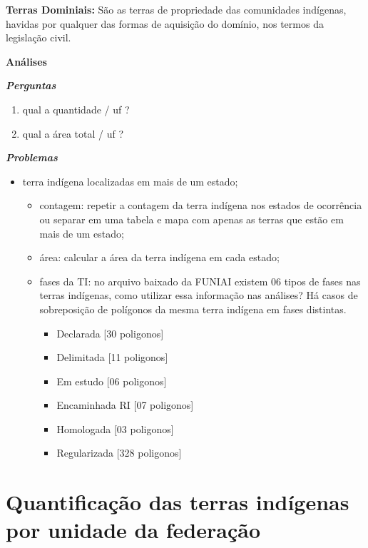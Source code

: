 \documentclass[
  letterpaper,
]{report}
\providecommand{\tightlist}{%
  \setlength{\itemsep}{0pt}\setlength{\parskip}{0pt}}\usepackage{longtable,booktabs,array}
\begin{document}
\textbf{Terras Dominiais:} São as terras de propriedade das comunidades
indígenas, havidas por qualquer das formas de aquisição do domínio, nos
termos da legislação civil.

\textbf{Análises}

\textbf{\emph{Perguntas}}

\begin{enumerate}
\def\labelenumi{\arabic{enumi}.}
\tightlist
\item
  qual a quantidade / uf ?
\item
  qual a área total / uf ?
\end{enumerate}

\textbf{\emph{Problemas}}

\begin{itemize}
\tightlist
\item
  terra indígena localizadas em mais de um estado;

  \begin{itemize}
  \tightlist
  \item
    contagem: repetir a contagem da terra indígena nos estados de
    ocorrência ou separar em uma tabela e mapa com apenas as terras que
    estão em mais de um estado;
  \item
    área: calcular a área da terra indígena em cada estado;
  \item
    fases da TI: no arquivo baixado da FUNIAI existem 06 tipos de fases
    nas terras indígenas, como utilizar essa informação nas análises? Há
    casos de sobreposição de polígonos da mesma terra indígena em fases
    distintas.

    \begin{itemize}
    \tightlist
    \item
      Declarada {[}30 poligonos{]}
    \item
      Delimitada {[}11 poligonos{]}
    \item
      Em estudo {[}06 poligonos{]}
    \item
      Encaminhada RI {[}07 poligonos{]}
    \item
      Homologada {[}03 poligonos{]}
    \item
      Regularizada {[}328 poligonos{]}
    \end{itemize}
  \end{itemize}
\end{itemize}

\hypertarget{quantificauxe7uxe3o-das-terras-induxedgenas-por-unidade-da-federauxe7uxe3o}{%
\section{Quantificação das terras indígenas por unidade da
federação}\label{quantificauxe7uxe3o-das-terras-induxedgenas-por-unidade-da-federauxe7uxe3o}}
\end{document}
